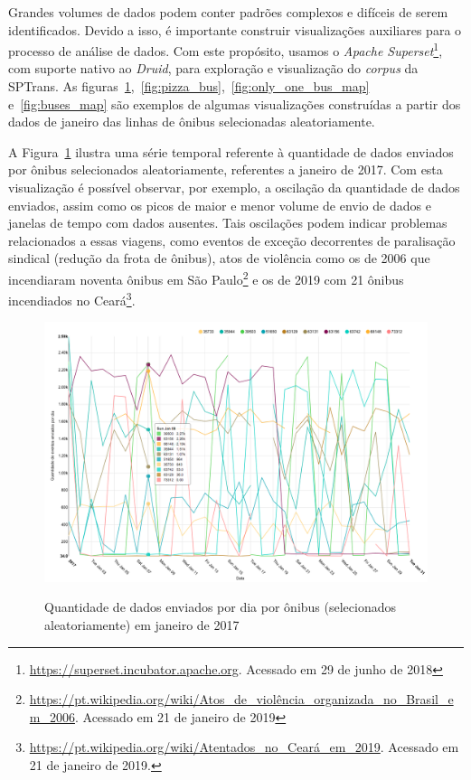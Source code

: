 \documentclass[
	12pt,				%
	oneside,			%
	a4paper,			%
	english,			%
	brazil				%
	]{abntex2ppgsi}
\begin{document}
{{{Grandes volumes de dados podem conter padrões complexos e difíceis de serem identificados. Devido a isso, é importante construir visualizações auxiliares para o processo de análise de dados. Com este propósito, usamos o \textit{Apache Superset}\footnote{\url{https://superset.incubator.apache.org}. Acessado em 29 de junho de 2018}, com suporte nativo ao \textit{Druid}, para exploração e visualização do \textit{corpus} da SPTrans. As figuras~\ref{fig:analysis_by_bus_lines},~\ref{fig:pizza_bus},~\ref{fig:only_one_bus_map} e~\ref{fig:buses_map} são exemplos de algumas visualizações construídas a partir dos dados de janeiro das linhas de ônibus selecionadas aleatoriamente.

A Figura~\ref{fig:analysis_by_bus_lines} ilustra uma série temporal referente à quantidade de dados enviados por ônibus selecionados aleatoriamente, referentes a janeiro de 2017. Com esta visualização é possível observar, por exemplo, a oscilação da quantidade de dados enviados, assim como os picos de maior e menor volume de envio de dados e janelas de tempo com dados ausentes. Tais oscilações podem indicar problemas relacionados a essas viagens, como eventos de exceção decorrentes de paralisação sindical (redução da frota de ônibus), atos de violência como os de 2006 que incendiaram noventa ônibus em São Paulo\footnote{\url{https://pt.wikipedia.org/wiki/Atos\_de_violência\_organizada\_no\_Brasil\_em\_2006}. Acessado em 21 de janeiro de 2019} e os de 2019 com 21 ônibus incendiados no Ceará\footnote{\url{https://pt.wikipedia.org/wiki/Atentados_no_Ceará_em_2019}. Acessado em 21 de janeiro de 2019.}. 

\begin{figure}[!htb]%
	\centering
 	  \caption{Quantidade de dados enviados por dia  por ônibus (selecionados aleatoriamente) em janeiro de 2017}
		\includegraphics[width=1\linewidth]{images/analysis_by_bus_lines_pt.png}
	\label{fig:analysis_by_bus_lines}
\end{figure}

}}}
\end{document}
